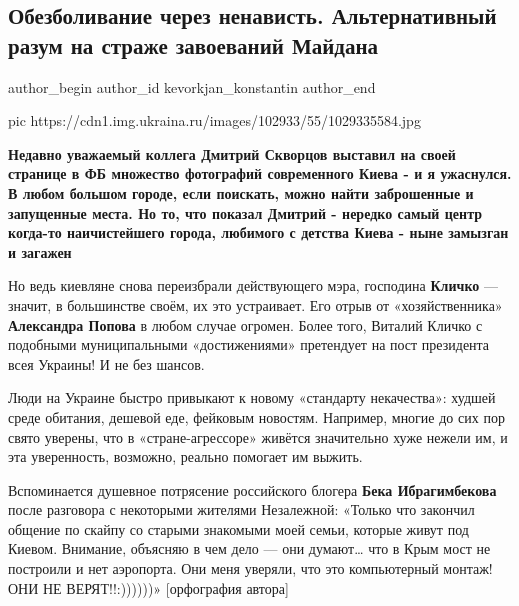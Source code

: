  
 
 
 
 
 
\subsection{Обезболивание через ненависть. Альтернативный разум на страже завоеваний Майдана}
\label{sec:13_12_2020.news.ru.ukraina_ru.kevorkjan_konstantin.1.obezbolivanie_cherez_nenavist}
\ifcmt
	author_begin
   author_id kevorkjan_konstantin
	author_end
\fi

\ifcmt
pic https://cdn1.img.ukraina.ru/images/102933/55/1029335584.jpg
\fi

\textbf{Недавно уважаемый коллега Дмитрий Скворцов выставил на своей странице в ФБ
множество фотографий современного Киева - и я ужаснулся. В любом большом
городе, если поискать, можно найти заброшенные и запущенные места. Но то, что
показал Дмитрий - нередко самый центр когда-то наичистейшего города, любимого с
детства Киева - ныне замызган и загажен}

Но ведь киевляне снова переизбрали действующего мэра, господина \textbf{Кличко} —
значит, в большинстве своём, их это устраивает. Его отрыв от «хозяйственника»
\textbf{Александра Попова} в любом случае огромен. Более того, Виталий Кличко с
подобными муниципальными «достижениями» претендует на пост президента всея
Украины! И не без шансов.

Люди на Украине быстро привыкают к новому «стандарту некачества»: худшей среде
обитания, дешевой еде, фейковым новостям. Например, многие до сих пор свято
уверены, что в «стране-агрессоре» живётся значительно хуже нежели им, и эта
уверенность, возможно, реально помогает им выжить.

Вспоминается душевное потрясение российского блогера \textbf{Бека
Ибрагимбекова} после разговора с некоторыми жителями Незалежной: «Только что
закончил общение по скайпу со старыми знакомыми моей семьи, которые живут под
Киевом. Внимание, объясняю в чем дело — они думают… что в Крым мост не
построили и нет аэропорта.  Они меня уверяли, что это компьютерный монтаж! ОНИ
НЕ ВЕРЯТ!!:))))))» [орфография автора]

